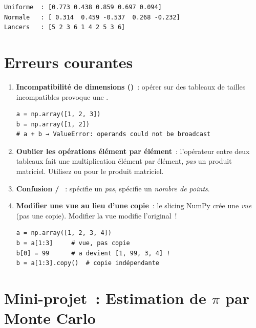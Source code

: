 \begin{codeoutput}
\begin{verbatim}
Uniforme  : [0.773 0.438 0.859 0.697 0.094]
Normale   : [ 0.314  0.459 -0.537  0.268 -0.232]
Lancers   : [5 2 3 6 1 4 2 5 3 6]
\end{verbatim}
\end{codeoutput}

\section{Erreurs courantes}

\begin{errmark}
\begin{enumerate}
    \item \textbf{Incompatibilit\'e de dimensions ()}~: op\'erer sur
    des tableaux de tailles incompatibles provoque une .
    \begin{verbatim}
a = np.array([1, 2, 3])
b = np.array([1, 2])
# a + b → ValueError: operands could not be broadcast
    \end{verbatim}

    \item \textbf{Oublier les op\'erations \'el\'ement par \'el\'ement}~: l'op\'erateur \py{*}
    entre deux tableaux fait une multiplication \'el\'ement par \'el\'ement, \emph{pas}
    un produit matriciel. Utilisez  ou  pour le produit matriciel.

    \item \textbf{Confusion  / }~:
     sp\'ecifie un \emph{pas},
     sp\'ecifie un \emph{nombre de points}.

    \item \textbf{Modifier une vue au lieu d'une copie}~: le slicing NumPy cr\'ee une
    \emph{vue} (pas une copie). Modifier la vue modifie l'original~!
    \begin{verbatim}
a = np.array([1, 2, 3, 4])
b = a[1:3]     # vue, pas copie
b[0] = 99      # a devient [1, 99, 3, 4] !
b = a[1:3].copy()  # copie indépendante
    \end{verbatim}
\end{enumerate}
\end{errmark}

\section{Mini-projet~: Estimation de $\pi$ par Monte Carlo}

